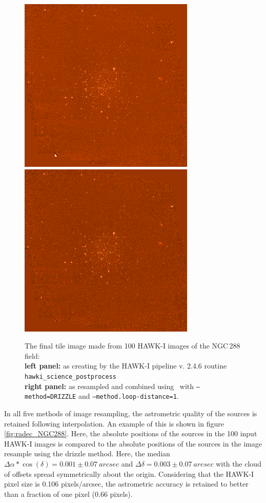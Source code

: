 \begin{figure}[H]
\centering
\includegraphics[width=8.4cm]{figures/Distortion_NGC288_TILED_IMAGE.png}
\includegraphics[width=8.4cm]{figures/hdrldemo_resample_DRIZZLE_HAWKI_NGC288_1.png} 
\caption[]
	{\footnotesize  The final tile image made from 100 HAWK-I images of the NGC\,288 field:\\
	{\bf left panel:}    as creating by the HAWK-I pipeline v. 2.4.6 routine {\tt hawki\_science\_postprocess}\\
	{\bf right panel:} as resampled and combined using \hdrlresample\ with {\tt --method=DRIZZLE} and {\tt --method.loop-distance=1}.\\
	}
	\label{fig:hawki_ngc288}
\end{figure}

In all five methods of image resampling, the astrometric quality of the sources is retained following interpolation.  An example of this is shown in 
figure \ref{fig:radec_NGC288}.  Here, the absolute positions of the sources in the 100 input HAWK-I images is compared to the absolute positions
of the sources in the image resample using the drizzle method.   Here, the median $\Delta\alpha*\cos(\delta)=0.001\pm0.07\ arcsec$ and 
$\Delta\delta=0.003\pm0.07\ arcsec$ with the cloud of offsets spread symmetrically about the origin.  
Considering that the HAWK-I pixel size is 0.106 pixels/arcsec, the astrometric accuracy is retained to better than a fraction of one pixel (0.66 pixels).

